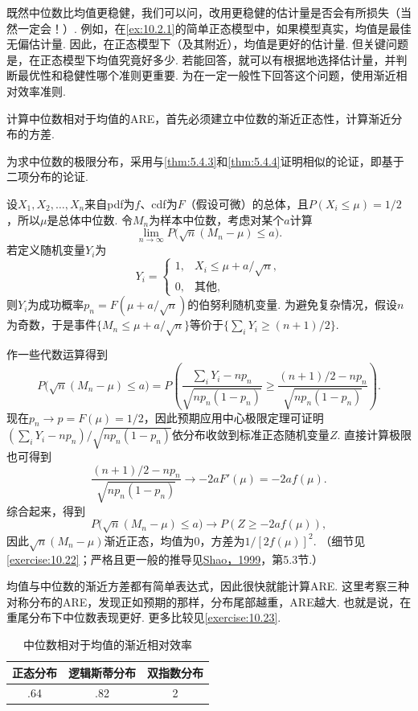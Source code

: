 既然中位数比均值更稳健，我们可以问，改用更稳健的估计量是否会有所损失（当然一定会！）. 例如，在\autoref{ex:10.2.1}的简单正态模型中，如果模型真实，均值是最佳无偏估计量. 因此，在正态模型下（及其附近），均值是更好的估计量. 但关键问题是，在正态模型下均值究竟好多少. 若能回答，就可以有根据地选择估计量，并判断最优性和稳健性哪个准则更重要. 为在一定一般性下回答这个问题，使用渐近相对效率准则.

计算中位数相对于均值的ARE，首先必须建立中位数的渐近正态性，计算渐近分布的方差.

\begin{example}[中位数的渐近正态性]\label{ex:10.2.3}
为求中位数的极限分布，采用与\autoref{thm:5.4.3}和\autoref{thm:5.4.4}证明相似的论证，即基于二项分布的论证.

设$X_1,X_2,\ldots,X_n$来自pdf为$f$、cdf为$F$（假设可微）的总体，且$P(X_i\leq\mu)=1/2$，所以$\mu$是总体中位数. 令$M_n$为样本中位数，考虑对某个$a$计算
$$\lim_{n\to\infty}P\bigl(\sqrt n(M_n-\mu)\leq a\bigr).$$
若定义随机变量$Y_i$为
$$Y_i=\begin{cases}1,&X_i\leq\mu+a/\sqrt n,\\0,&\text{其他},\end{cases}$$
则$Y_i$为成功概率$p_n=F(\mu+a/\sqrt n)$的伯努利随机变量. 为避免复杂情况，假设$n$为奇数，于是事件$\{M_n\leq\mu+a/\sqrt n\}$等价于$\{\sum_iY_i\geq(n+1)/2\}$.

作一些代数运算得到
$$P\bigl(\sqrt n(M_n-\mu)\leq a\bigr)=P\left(\frac{\sum_iY_i-np_n}{\sqrt{np_n(1-p_n)}}\geq\frac{(n+1)/2-np_n}{\sqrt{np_n(1-p_n)}}\right).$$
现在$p_n\to p=F(\mu)=1/2$，因此预期应用中心极限定理可证明$(\sum_iY_i-np_n)/\sqrt{np_n(1-p_n)}$依分布收敛到标准正态随机变量$Z$. 直接计算极限也可得到
$$\frac{(n+1)/2-np_n}{\sqrt{np_n(1-p_n)}}\longrightarrow-2aF'(\mu)=-2af(\mu).$$
综合起来，得到
$$P\bigl(\sqrt n(M_n-\mu)\leq a\bigr)\longrightarrow P(Z\geq-2af(\mu)),$$
因此$\sqrt n(M_n-\mu)$渐近正态，均值为0，方差为$1/[2f(\mu)]^2$. （细节见\autoref{exercise:10.22}；严格且更一般的推导见\hyperref[bib:source287]{Shao，1999}，第5.3节.）
\end{example}

\begin{example}[中位数相对于均值的ARE]\label{ex:10.2.4}
均值与中位数的渐近方差都有简单表达式，因此很快就能计算ARE. 这里考察三种对称分布的ARE，发现正如预期的那样，分布尾部越重，ARE越大. 也就是说，在重尾分布下中位数表现更好. 更多比较见\autoref{exercise:10.23}.
\end{example}
\par\begin{table}[htbp]
\centering\setcounter{table}{1}
\caption{中位数相对于均值的渐近相对效率}\label{tab:10.2.2}
\begin{tabular}{ccc}\toprule 正态分布&逻辑斯蒂分布&双指数分布\\\midrule .64&.82&2\\\bottomrule\end{tabular}
\end{table}\par

